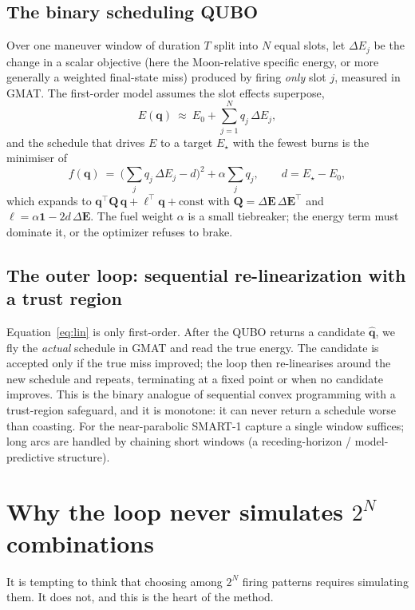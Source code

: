 \documentclass[11pt,a4paper]{article}
\theoremstyle{plain}
\begin{document}
\subsection{The binary scheduling QUBO}
Over one maneuver window of duration $T$ split into $N$ equal slots, let
$\Delta E_j$ be the change in a scalar objective (here the Moon-relative
specific energy, or more generally a weighted final-state miss) produced by
firing \emph{only} slot $j$, measured in GMAT. The first-order model assumes
the slot effects superpose,
\begin{equation}\label{eq:lin}
  E(\bm q)\ \approx\ E_0 + \sum_{j=1}^{N} q_j\,\Delta E_j ,
\end{equation}
and the schedule that drives $E$ to a target $E_\star$ with the fewest burns
is the minimiser of
\begin{equation}\label{eq:qubo}
  f(\bm q)\ =\ \Big(\textstyle\sum_j q_j\,\Delta E_j - d\Big)^2
              + \alpha \sum_j q_j ,
  \qquad d = E_\star - E_0 ,
\end{equation}
which expands to $\bm q^\top\bm Q\,\bm q + \bm\ell^\top\bm q + \text{const}$
with $\bm Q = \Delta\bm E\,\Delta\bm E^\top$ and
$\bm\ell = \alpha\bm 1 - 2d\,\Delta\bm E$. The fuel weight $\alpha$ is a small
tiebreaker; the energy term must dominate it, or the optimizer refuses to
brake.

\subsection{The outer loop: sequential re-linearization with a trust region}
Equation~\eqref{eq:lin} is only first-order. After the QUBO returns a
candidate $\hat{\bm q}$, we fly the \emph{actual} schedule in GMAT and read the
true energy. The candidate is accepted only if the true miss improved; the
loop then re-linearises around the new schedule and repeats, terminating at a
fixed point or when no candidate improves. This is the binary analogue of
sequential convex programming with a trust-region safeguard, and it is
monotone: it can never return a schedule worse than coasting. For the
near-parabolic SMART-1 capture a single window suffices; long arcs are handled
by chaining short windows (a receding-horizon / model-predictive structure).

\section{Why the loop never simulates $2^{N}$ combinations}\label{sec:no2N}
It is tempting to think that choosing among $2^{N}$ firing patterns requires
simulating them. It does not, and this is the heart of the method.
\end{document}
